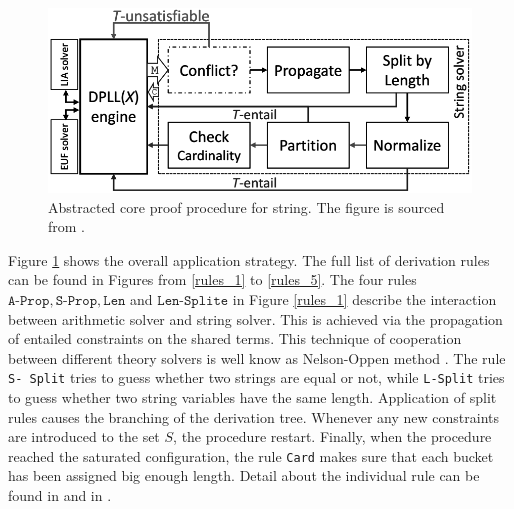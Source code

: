    \begin{figure}[htb]
   	\centering
   	\includegraphics[width=0.7\linewidth]{pictures/proof_procedure.png}
   	\caption{Abstracted core proof procedure for string. The figure is sourced from \cite{main_phd}.}
   	\label{fig:proof_procedure}
   \end{figure}
  Figure \ref{fig:proof_procedure} shows the overall application strategy. The full list of derivation rules can be found in Figures from \ref{rules_1} to \ref{rules_5}. The four rules $\texttt{A-Prop},\texttt{S-Prop},\texttt{Len}$ and $\texttt{Len-Splite}$  in Figure \ref{rules_1} describe the interaction between arithmetic solver and string solver. This is achieved via the propagation of entailed constraints on the shared terms. This technique of cooperation between different theory solvers is well know as Nelson-Oppen method \cite{nelson_oppen}. The rule \texttt{S- Split}  tries to guess whether two strings are equal or not, while \texttt{L-Split} tries to guess whether two string variables have the same length.  Application of split rules causes the branching of the derivation tree. Whenever any new constraints are introduced to the set $S$, the procedure restart. Finally, when the procedure reached the saturated configuration, the rule \texttt{Card} makes sure that each bucket has been assigned big enough length. Detail about the individual rule can be found in \cite{main_phd} and in \cite{main-paper}.
 
 
 
 
 
 